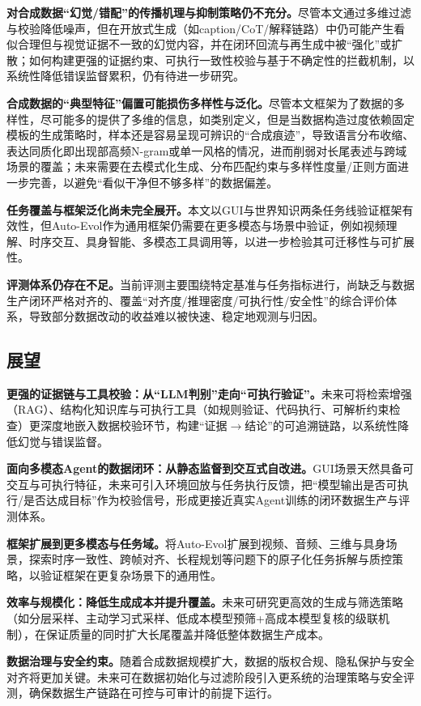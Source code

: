 \textbf{对合成数据“幻觉/错配”的传播机理与抑制策略仍不充分。}尽管本文通过多维过滤与校验降低噪声，但在开放式生成（如caption/CoT/解释链路）中仍可能产生看似合理但与视觉证据不一致的幻觉内容，并在闭环回流与再生成中被“强化”或扩散；如何构建更强的证据约束、可执行一致性校验与基于不确定性的拦截机制，以系统性降低错误监督累积，仍有待进一步研究。

\textbf{合成数据的“典型特征”偏置可能损伤多样性与泛化。}尽管本文框架为了数据的多样性，尽可能多的提供了多维的信息，如类别定义，但是当数据构造过度依赖固定模板的生成策略时，样本还是容易呈现可辨识的“合成痕迹”，导致语言分布收缩、表达同质化即出现部高频N-gram或单一风格的情况，进而削弱对长尾表述与跨域场景的覆盖；未来需要在去模式化生成、分布匹配约束与多样性度量/正则方面进一步完善，以避免“看似干净但不够多样”的数据偏差。

\textbf{任务覆盖与框架泛化尚未完全展开。}本文以GUI与世界知识两条任务线验证框架有效性，但Auto-Evol作为通用框架仍需要在更多模态与场景中验证，例如视频理解、时序交互、具身智能、多模态工具调用等，以进一步检验其可迁移性与可扩展性。

\textbf{评测体系仍存在不足。}当前评测主要围绕特定基准与任务指标进行，尚缺乏与数据生产闭环严格对齐的、覆盖“对齐度/推理密度/可执行性/安全性”的综合评价体系，导致部分数据改动的收益难以被快速、稳定地观测与归因。


\subsection{展望}

\textbf{更强的证据链与工具校验：从“LLM判别”走向“可执行验证”。}未来可将检索增强（RAG）、结构化知识库与可执行工具（如规则验证、代码执行、可解析约束检查）更深度地嵌入数据校验环节，构建“证据$\rightarrow$结论”的可追溯链路，以系统性降低幻觉与错误监督。

\textbf{面向多模态Agent的数据闭环：从静态监督到交互式自改进。}GUI场景天然具备可交互与可执行特征，未来可引入环境回放与任务执行反馈，把“模型输出是否可执行/是否达成目标”作为校验信号，形成更接近真实Agent训练的闭环数据生产与评测体系。

\textbf{框架扩展到更多模态与任务域。}将Auto-Evol扩展到视频、音频、三维与具身场景，探索时序一致性、跨帧对齐、长程规划等问题下的原子化任务拆解与质控策略，以验证框架在更复杂场景下的通用性。

\textbf{效率与规模化：降低生成成本并提升覆盖。}未来可研究更高效的生成与筛选策略（如分层采样、主动学习式采样、低成本模型预筛+高成本模型复核的级联机制），在保证质量的同时扩大长尾覆盖并降低整体数据生产成本。

\textbf{数据治理与安全约束。}随着合成数据规模扩大，数据的版权合规、隐私保护与安全对齐将更加关键。未来可在数据初始化与过滤阶段引入更系统的治理策略与安全评测，确保数据生产链路在可控与可审计的前提下运行。

